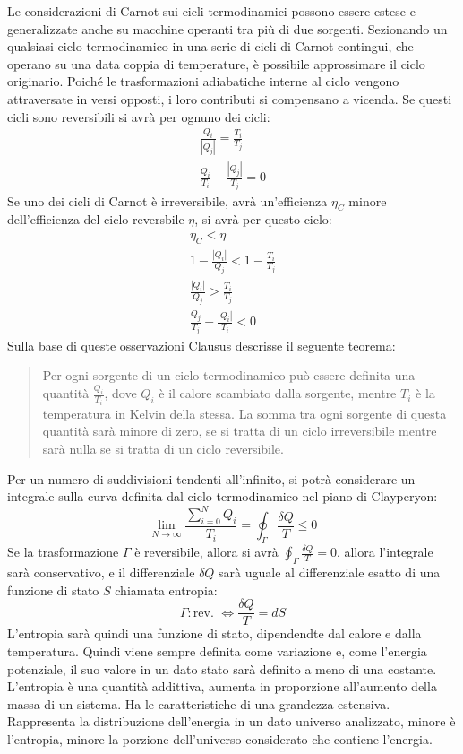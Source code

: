 \documentclass{article}
\numberwithin{equation}{subsection}
\begin{document}
Le considerazioni di Carnot sui cicli termodinamici possono essere estese e generalizzate anche su macchine operanti tra più di due sorgenti. Sezionando un qualsiasi ciclo 
termodinamico in una serie di cicli di Carnot contingui, che operano su una data coppia di temperature, è possibile approssimare il ciclo originario. Poiché le trasformazioni 
adiabatiche interne al ciclo vengono attraversate in versi opposti, i loro contributi si compensano a vicenda. 
Se questi cicli sono reversibili si avrà per ognuno dei cicli:
\begin{gather*}
    \displaystyle\frac{Q_i}{|Q_j|}=\frac{T_i}{T_j}\\
    \displaystyle\frac{Q_i}{T_i}-\frac{|Q_j|}{T_j}=0
\end{gather*}
Se uno dei cicli di Carnot è irreversibile, avrà un'efficienza $\eta_C$ minore dell'efficienza del ciclo reversbile $\eta$, si avrà per questo ciclo: 
\begin{gather*}
    \eta_C<\eta\\
    1-\displaystyle\frac{|Q_i|}{Q_j}<1-\frac{T_i}{T_j}\\
    \displaystyle\frac{|Q_i|}{Q_j}>\frac{T_i}{T_j}\\
    \displaystyle\frac{Q_j}{T_j}-\frac{|Q_i|}{T_i}<0
\end{gather*}
Sulla base di queste osservazioni Clausus descrisse il seguente teorema: 
\begin{quotation}
    Per ogni sorgente di un ciclo termodinamico può essere definita una quantità $\displaystyle\frac{Q_i}{T_i}$, dove $Q_i$ è il calore scambiato dalla sorgente, mentre $T_i$ è 
    la temperatura in Kelvin della stessa. La somma tra ogni sorgente di questa quantità sarà minore di zero, se si tratta di un 
    ciclo irreversibile mentre sarà nulla se si tratta di un ciclo reversibile. 
\end{quotation}
Per un numero di suddivisioni tendenti all'infinito, si potrà considerare un integrale sulla curva 
definita dal ciclo termodinamico nel piano di Clayperyon:
\begin{equation*}
    \lim_{N\to\infty}\displaystyle\frac{\sum_{i=0}^NQ_i}{T_i}=\oint_{\Gamma}\frac{\delta Q}{T}\leq0
\end{equation*}
Se la trasformazione $\Gamma$ è reversibile, allora si avrà $\displaystyle\oint_{\Gamma}\frac{\delta Q}{T}=0$, allora l'integrale sarà conservativo, e 
il differenziale $\delta Q$ sarà uguale al differenziale esatto di una funzione di stato $S$ chiamata entropia:
\begin{equation}
    \Gamma:\mbox{rev. }\iff\displaystyle\frac{\delta Q}{T} =dS
\end{equation} 
L'entropia sarà quindi una funzione di stato, dipendendte dal calore e dalla temperatura. Quindi viene sempre definita come variazione e, come l'energia potenziale, il suo 
valore in un dato stato sarà definito a meno di una costante. 
L'entropia è una quantità addittiva, aumenta in proporzione all'aumento della massa di un sistema. Ha le caratteristiche di una grandezza estensiva. Rappresenta 
la distribuzione dell'energia in un dato universo analizzato, minore è l'entropia, minore la porzione dell'universo considerato che contiene l'energia. 
\end{document}
